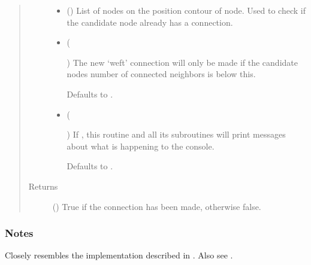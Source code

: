 \documentclass[letterpaper,10pt,english]{sphinxmanual}
\begin{document}
\begin{fulllineitems}
\begin{fulllineitems}
\begin{quote}
\begin{description}
\begin{itemize}
\item {} 
 () \textendash{} List of nodes on the position contour of node. Used to check if
the candidate node already has a connection.

\item {} 
 (%
\begin{footnote}[113]\sphinxAtStartFootnote
{}
%
\end{footnote}\sphinxstyleliteralemphasis{\sphinxupquote{, }}) \textendash{} 
The new ‘weft’ connection will only be made if the candidate nodes
number of connected neighbors is below this.

Defaults to .


\item {} 
 (%
\begin{footnote}[114]\sphinxAtStartFootnote
{}
%
\end{footnote}\sphinxstyleliteralemphasis{\sphinxupquote{, }}) \textendash{} 
If , this routine and all its subroutines will print
messages about what is happening to the console.

Defaults to .


\end{itemize}

\item[{Returns}] \leavevmode
{} () \textendash{} True if the connection has been made, otherwise false.

\end{description}\end{quote}
\subsubsection*{Notes}

Closely resembles the implementation described in  \sphinxfootnotemark[1]. Also see
 \sphinxfootnotemark[2].


\end{fulllineitems}
\end{fulllineitems}
\end{document}
